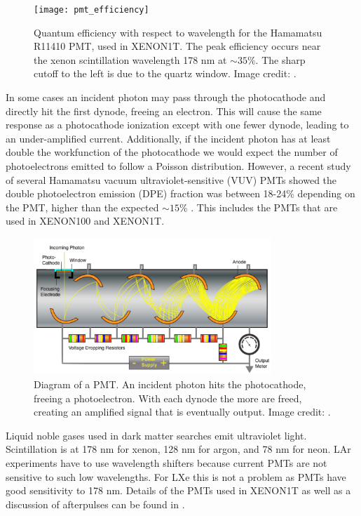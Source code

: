 \begin{figure}
\centering
\texttt{[image: pmt\_efficiency]}
\caption{Quantum efficiency with respect to wavelength for the Hamamatsu R11410 PMT, used in XENON1T.  The peak efficiency occurs near
the xenon scintillation wavelength 178 nm at $\sim 35 \%$.  The sharp cutoff to the left is due to the quartz window.  Image credit:
.}
\label{fig:tpcs_pmts_qe}
\end{figure}

In some cases an incident photon may pass through the photocathode and directly hit the first dynode, freeing an electron.  This will
cause the same response as a photocathode ionization except with one fewer dynode, leading to an under-amplified current.  Additionally,
if the incident photon has at least double the workfunction of the photocathode we would expect the number of photoelectrons emitted to
follow a Poisson distribution.  However, a recent study of several Hamamatsu vacuum ultraviolet-sensitive (VUV) PMTs showed the double
photoelectron emission
(DPE) fraction was between 18-24\% depending on the PMT, higher than the expected $\sim 15\%$ .  This includes the
PMTs that are used in XENON100 and XENON1T.

\begin{figure}
\centering
\includegraphics[width=0.8\textwidth]{PMT1Better}
\caption{Diagram of a PMT.  An incident photon hits the photocathode, freeing a photoelectron.  With each dynode the more \electron are
freed, creating an amplified signal that is eventually output.  Image credit: .}
\label{fig:tpcs_pmts_pmt_diagram}
\end{figure}

Liquid noble gases used in dark matter searches emit ultraviolet light.  Scintillation is at 178 nm for xenon, 128 nm for argon, and
78 nm for neon.  LAr experiments have to use wavelength shifters because current PMTs are not sensitive to such low wavelengths.  For
LXe this is not a problem as PMTs have good sensitivity to 178 nm.  Details of the PMTs used in XENON1T as well as a discussion of
afterpulses can be found in .



